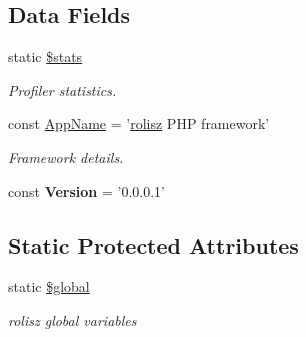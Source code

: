 \subsection*{Data Fields}
\begin{DoxyCompactItemize}
\item 
\hypertarget{classbase_ac61adefb58583938c9b820405ddfa018}{
static \hyperlink{classbase_ac61adefb58583938c9b820405ddfa018}{\$stats}}
\label{classbase_ac61adefb58583938c9b820405ddfa018}

\begin{DoxyCompactList}\small\item\em Profiler statistics. \item\end{DoxyCompactList}\end{DoxyCompactItemize}
{\bf }\par
\begin{DoxyCompactItemize}
\item 
\hypertarget{classbase_aab75444b144ffc4e972a9170e0a76ec0}{
const \hyperlink{classbase_aab75444b144ffc4e972a9170e0a76ec0}{AppName} = '\hyperlink{classrolisz}{rolisz} PHP framework'}
\label{classbase_aab75444b144ffc4e972a9170e0a76ec0}

\begin{DoxyCompactList}\small\item\em Framework details. \item\end{DoxyCompactList}\item 
\hypertarget{classbase_a62e44de9100d83ee01f5b4875b49a02b}{
const {\bfseries Version} = '0.0.0.1'}
\label{classbase_a62e44de9100d83ee01f5b4875b49a02b}

\end{DoxyCompactItemize}

\subsection*{Static Protected Attributes}
\begin{DoxyCompactItemize}
\item 
\hypertarget{classbase_aad844777d9d6beb4ca7c92d97afe7d27}{
static \hyperlink{classbase_aad844777d9d6beb4ca7c92d97afe7d27}{\$global}}
\label{classbase_aad844777d9d6beb4ca7c92d97afe7d27}

\begin{DoxyCompactList}\small\item\em rolisz global variables \item\end{DoxyCompactList}\end{DoxyCompactItemize}


